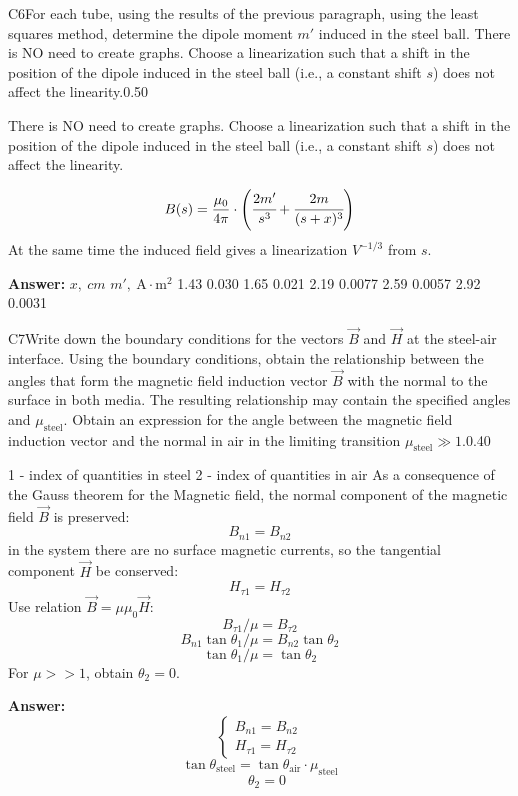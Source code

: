 \documentclass[11pt,a4paper]{article}
\begin{document}
\begin{solcard}{C6}{For each tube, using the results of the previous paragraph, using the least squares method, determine the dipole moment $m'$ induced in the steel ball. There is NO need to create graphs. Choose a linearization such that a shift in the position of the dipole induced in the steel ball (i.e., a constant shift $s$) does not affect the linearity.}{0.50}

There is NO need to create graphs. Choose a linearization such that a shift in the position of the dipole induced in the steel ball (i.e., a constant shift $s$) does not affect the linearity.


$$B(s) = \frac{\mu_0}{4\pi}\cdot \left( \cfrac{2m'}{s^3} + \cfrac{2m}{(s+x)^3} \right)$$At the same time the induced field gives a linearization $V^{-1/3}$ from $s$.

\par\smallskip\noindent\textbf{Answer:} $x,~cm$ $m',~\mathrm{A} \cdot \mathrm{m}^2$ 1.43 0.030 1.65 0.021 2.19 0.0077 2.59 0.0057 2.92 0.0031
\end{solcard}

\begin{solcard}{C7}{Write down the boundary conditions for the vectors $\vec{B}$ and $\vec{H}$ at the steel-air interface. Using the boundary conditions, obtain the relationship between the angles that form the magnetic field induction vector $\vec{B}$ with the normal to the surface in both media. The resulting relationship may contain the specified angles and $\mu_\text{steel}$. Obtain an expression for the angle between the magnetic field induction vector and the normal in air in the limiting transition $\mu_\text{steel}\gg 1$.}{0.40}

1 - index of quantities in steel 2 - index of quantities in air As a consequence of the Gauss theorem for the Magnetic field, the normal component of the magnetic field $\vec{B}$ is preserved: $$B_{n1} = B_{n2}$$in the system there are no surface magnetic currents, so the tangential component $\vec{H}$ be conserved: $$H_{\tau 1} = H_{\tau 2}$$Use relation $\vec{B} = \mu \mu_0 \vec{H}$: $$B_{\tau 1} / \mu = B_{\tau 2}$$$$B_{n1} \tan{\theta_1} / \mu = B_{n2} \tan{\theta_2}$$$$\tan{\theta_1} / \mu = \tan{\theta_2}$$For $\mu >> 1$, obtain $\theta_2 = 0$.

\par\smallskip\noindent\textbf{Answer:} \[\begin{cases} B_{n1} = B_{n2} \\ H_{\tau 1} = H_{\tau 2} \end{cases} \] \[ \tan{\theta_\text{steel}} = \tan{\theta_\text{air}}\cdot \mu_\text{steel}\] \[ \quad\theta_2 = 0 \]
\end{solcard}
\end{document}
